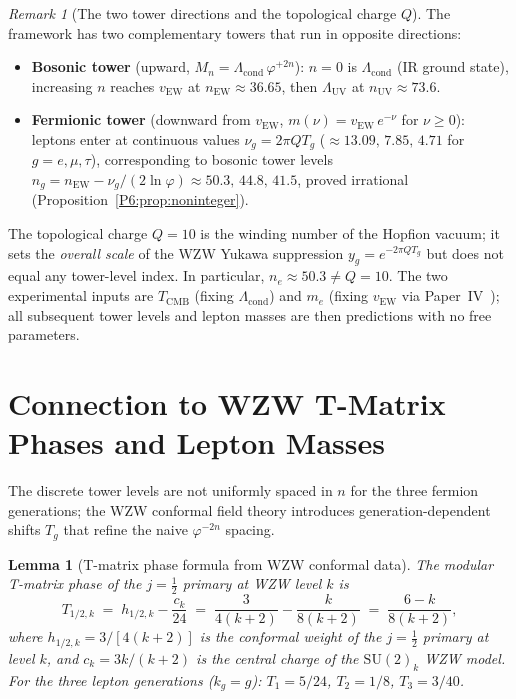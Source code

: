 \documentclass[11pt,a4paper]{article}
\newtheorem{lemma}[theorem]{Lemma}
\theoremstyle{definition}
\theoremstyle{remark}
\newtheorem{remark}[theorem]{Remark}
\newcommand{\vp}{\varphi}
\newcommand{\TCMB}{T_{\mathrm{CMB}}}
\newcommand{\vEW}{v_{\mathrm{EW}}}
\newcommand{\Lcond}{\Lambda_{\mathrm{cond}}}
\newcommand{\LUV}{\Lambda_{\mathrm{UV}}}
\begin{document}
\begin{remark}[The two tower directions and the topological charge $Q$]
\label{P6:rem:tower_directions}
The framework has two complementary towers that run in opposite directions:
\begin{itemize}[noitemsep]
\item \textbf{Bosonic tower} (upward, $M_n = \Lcond\,\vp^{+2n}$):
  $n=0$ is $\Lcond$ (IR ground state), increasing $n$ reaches $\vEW$
  at $n_\mathrm{EW}\approx36.65$, then $\LUV$ at $n_\mathrm{UV}\approx73.6$.
\item \textbf{Fermionic tower} (downward from $\vEW$,
  $m(\nu) = \vEW\,e^{-\nu}$ for $\nu\geq0$):
  leptons enter at continuous values
  $\nu_g = 2\pi QT_g$ ($\approx13.09,\,7.85,\,4.71$ for $g=e,\mu,\tau$),
  corresponding to bosonic tower levels
  $n_g = n_\mathrm{EW} - \nu_g/(2\ln\vp)\approx50.3,\,44.8,\,41.5$,
  proved irrational (Proposition~\ref{P6:prop:noninteger}).
\end{itemize}
The topological charge $Q=10$ is the winding number of the Hopfion vacuum;
it sets the \emph{overall scale} of the WZW Yukawa suppression
$y_g = e^{-2\pi QT_g}$ but does not equal any tower-level index.
In particular, $n_e\approx50.3\neq Q=10$.
The two experimental inputs are $\TCMB$ (fixing $\Lcond$) and $m_e$
(fixing $\vEW$ via Paper~IV~\cite{Paper4}); all subsequent tower levels
and lepton masses are then predictions with no free parameters.
\end{remark}

\section{Connection to WZW T-Matrix Phases and Lepton Masses}
\label{P6:sec:wzw}

The discrete tower levels are not uniformly spaced in $n$ for the
three fermion generations; the WZW conformal field theory introduces
generation-dependent shifts $T_g$ that refine the naive $\vp^{-2n}$
spacing.

\begin{lemma}[T-matrix phase formula from WZW conformal data]
\label{P6:lem:tmatrix}
The modular T-matrix phase of the $j=\tfrac{1}{2}$ primary at
WZW level $k$ is
\begin{equation}
  T_{1/2,k}
  \;=\; h_{1/2,k} - \frac{c_k}{24}
  \;=\; \frac{3}{4(k+2)} - \frac{k}{8(k+2)}
  \;=\; \frac{6-k}{8(k+2)},
  \label{P6:eq:tmatrix_formula}
\end{equation}
where $h_{1/2,k} = 3/[4(k+2)]$ is the conformal weight of the $j=\tfrac{1}{2}$
primary at level $k$, and $c_k = 3k/(k+2)$ is the central charge of the
$\mathrm{SU}(2)_k$ WZW model.
For the three lepton generations ($k_g = g$):
$T_1 = 5/24$, $T_2 = 1/8$, $T_3 = 3/40$.
\end{lemma}
\end{document}
